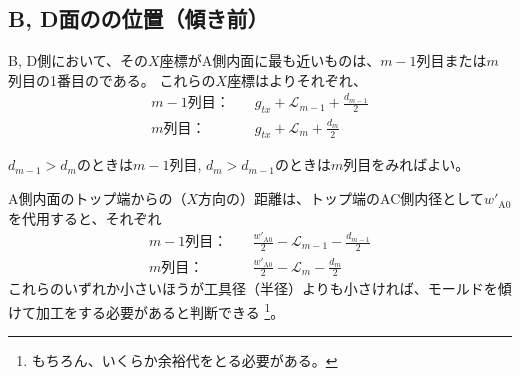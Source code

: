 



\clearpage
\subsection{B, D面の\dimple の位置（傾き前）}
B, D側\dimple において、その$X$座標がA側内面に最も近いものは、$m-1$列目または$m$列目の1番目の\dimple である。
これらの$X$座標はよりそれぞれ、
\begin{align*}
  m-1\text{列目：}&\quad
  g_{tx}+\mathcal L_{m-1}+\frac{d_{m-1}}2\\
  m\text{列目：}&\quad
  g_{tx}+\mathcal L_m+\frac{d_m}2
\end{align*}
\begin{hosoku}
$d_{m-1} > d_m$のときは$m-1$列目, $d_m > d_{m-1}$のときは$m$列目をみればよい。
\end{hosoku}
A側内面のトップ端からの（$X$方向の）距離は、トップ端のAC側内径として$w'_{\mathrm A0}$を代用すると、それぞれ
\begin{align*}
  m-1\text{列目：}&\quad
  \frac{w'_{\mathrm A0}}2-\mathcal L_{m-1}-\frac{d_{m-1}}2\\
  m\text{列目：}&\quad
  \frac{w'_{\mathrm A0}}2-\mathcal L_m-\frac{d_m}2
\end{align*}
これらのいずれか小さいほうが工具径（半径）よりも小さければ、モールドを傾けて加工をする必要があると判断できる
\footnote{もちろん、いくらか余裕代をとる必要がある。}。
